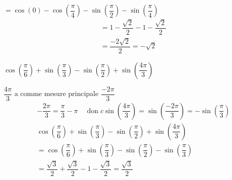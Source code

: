 \documentclass[11pt,a4paper]{article}  %
\begin{document}
\begin{enumMet}
\begin{corrBox}
$$		$$
		$=\cos (0)-\cos \left(\dfrac{\pi}{4}\right)-\sin \left(\dfrac{\pi}{2}\right)-\sin \left(\dfrac{\pi}{4}\right)$
		$$
		\begin{aligned}
			& =1-\dfrac{\sqrt{2}}{2}-1-\dfrac{\sqrt{2}}{2} \\
			& =\dfrac{-2 \sqrt{2}}{2}=-\sqrt{2}
		\end{aligned}
		$$
	\end{corrBox}
	\item $\cos \left(\dfrac{\pi}{6}\right)+\sin \left(\dfrac{\pi}{3}\right)-\sin \left(\dfrac{\pi}{2}\right)+\sin \left(\dfrac{4 \pi}{3}\right)$
	\begin{corrBox}
		$\dfrac{4 \pi}{3}$ a comme mesure principale $\dfrac{-2 \pi}{3}$
		$$
		\begin{aligned}
			& -\dfrac{2 \pi}{3}=\dfrac{\pi}{3}-\pi \quad \operatorname{don} c \sin \left(\dfrac{4 \pi}{3}\right)=\sin \left(\dfrac{-2 \pi}{3}\right)=-\sin \left(\dfrac{\pi}{3}\right) \\
			& \cos \left(\dfrac{\pi}{6}\right)+\sin \left(\dfrac{\pi}{3}\right)-\sin \left(\dfrac{\pi}{2}\right)+\sin \left(\dfrac{4 \pi}{3}\right) \\
			& =\cos \left(\dfrac{\pi}{6}\right)+\sin \left(\dfrac{\pi}{3}\right)-\sin \left(\dfrac{\pi}{2}\right)-\sin \left(\dfrac{\pi}{3}\right) \\
			& =\dfrac{\sqrt{3}}{2}+\dfrac{\sqrt{3}}{2}-1-\dfrac{\sqrt{3}}{2}=\dfrac{\sqrt{3}}{2}
		\end{aligned}
		$$				
	\end{corrBox}
\end{enumMet}

\exercice{}
\end{document}
